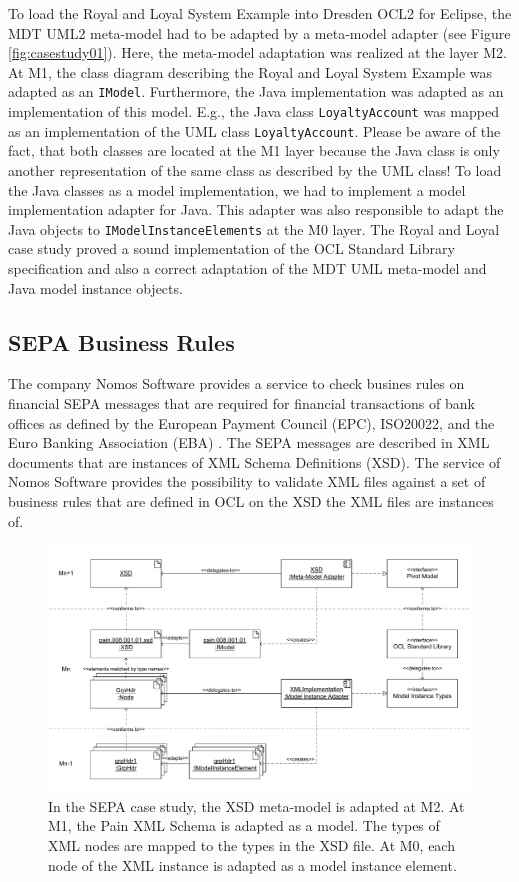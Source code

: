 To load the Royal and Loyal System Example into Dresden OCL2 for Eclipse, the MDT UML2 meta-model had to be adapted by a meta-model adapter (see Figure \ref{fig:casestudy01}). Here, the meta-model adaptation was realized at the layer M2. At M1, the class diagram describing the Royal and Loyal System Example was adapted as an \texttt{IModel}. Furthermore, the Java implementation was adapted as an implementation of this model. E.g., the Java class \texttt{LoyaltyAccount} was mapped as an implementation of the UML class \texttt{LoyaltyAccount}. Please be aware of the fact, that both classes are located at the M1 layer because the Java class is only another representation of the same class as described by the UML class! To load the Java classes as a model implementation, we had to implement a model implementation adapter for Java. This adapter was also responsible to adapt the Java objects to \texttt{IModelInstanceElements} at the M0 layer. The Royal and Loyal case study proved a sound implementation of the OCL Standard Library specification and also a correct adaptation of the MDT UML meta-model and Java model instance objects.



\subsection{SEPA Business Rules}

The company Nomos Software provides a service to check busines rules on financial SEPA messages that are required for financial transactions of bank offices as defined by the European Payment Council (EPC), ISO20022, and the Euro Banking Association (EBA) \cite{spec:UNIFI,spec:EPC}. The SEPA messages are described in XML documents that are instances of XML Schema Definitions (XSD). The service of Nomos Software provides the possibility to validate XML files against a set of business rules that are defined in OCL on the XSD the XML files are instances of.

\begin{figure}[tb]
	\centering
		\includegraphics[width=1.00\textwidth]{figures/casestudy02.pdf}
	\caption{In the SEPA case study, the XSD meta-model is adapted at M2. At M1, the Pain XML Schema is adapted as a model. The types of XML nodes are mapped to the types in the XSD file. At M0, each node of the XML instance is adapted as a model instance element.}
	\label{fig:casestudy02}
\end{figure}

